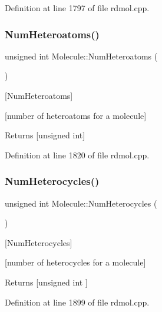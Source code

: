 Definition at line 1797 of file rdmol.\+cpp.

\mbox{\label{class_molecule_a582058277ae6808a93cf6ef186037eaa}} 
\subsubsection{\texorpdfstring{Num\+Heteroatoms()}{NumHeteroatoms()}}
{\footnotesize\ttfamily unsigned int Molecule\+::\+Num\+Heteroatoms (\begin{DoxyParamCaption}{ }\end{DoxyParamCaption})}



\mbox{[}Num\+Heteroatoms\mbox{]} 

\mbox{[}number of heteroatoms for a molecule\mbox{]}

\begin{DoxyReturn}{Returns}
\mbox{[}unsigned int\mbox{]} 
\end{DoxyReturn}


Definition at line 1820 of file rdmol.\+cpp.

\mbox{\label{class_molecule_a9ea5ea968d6b3712d059b33fcd860c94}} 
\subsubsection{\texorpdfstring{Num\+Heterocycles()}{NumHeterocycles()}}
{\footnotesize\ttfamily unsigned int Molecule\+::\+Num\+Heterocycles (\begin{DoxyParamCaption}{ }\end{DoxyParamCaption})}



\mbox{[}Num\+Heterocycles\mbox{]} 

\mbox{[}number of heterocycles for a molecule\mbox{]}

\begin{DoxyReturn}{Returns}
\mbox{[}unsigned int \mbox{]} 
\end{DoxyReturn}


Definition at line 1899 of file rdmol.\+cpp.

\mbox{\label{class_molecule_a0a3b03a9c5fcc9d24f2f285fdb68361a}} 
